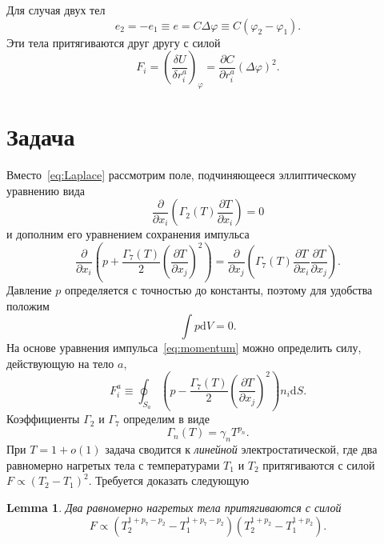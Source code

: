 \documentclass{article}
\theoremstyle{plain}
\newtheorem{lemma}{Lemma}
\newcommand{\dd}{\mathrm{d}}
\newcommand{\pder}[2][]{\frac{\partial#1}{\partial#2}}
\newcommand{\eqdef}{\equiv}
\begin{document}
Для случая двух тел
\begin{equation}\label{eq:capacity}
    e_2 = -e_1 \eqdef e = C\Delta\varphi \eqdef C(\varphi_2 - \varphi_1).
\end{equation}
Эти тела притягиваются друг другу с силой
\begin{equation}\label{eq:force2}
    F_i = \left(\frac{\delta U}{\delta r^a_i}\right)_\varphi = \pder[C]{r^a_i}(\Delta\varphi)^2.
\end{equation}

\section{Задача}

Вместо~\eqref{eq:Laplace} рассмотрим поле, подчиняющееся эллиптическому уравнению вида
\begin{equation}\label{eq:elliptic}
    \pder{x_i}\left( \Gamma_2(T) \pder[T]{x_i} \right) = 0
\end{equation}
и дополним его уравнением сохранения импульса
\begin{equation}\label{eq:momentum}
    \pder{x_i}\left( p + \frac{\Gamma_7(T)}{2}\left(\pder[T]{x_j}\right)^2 \right) =
    \pder{x_j}\left( \Gamma_7(T)\pder[T]{x_i}\pder[T]{x_j} \right).
\end{equation}
Давление \(p\) определяется с точностью до константы, поэтому для удобства положим
\begin{equation}\label{eq:pressure}
    \int p\dd{V} = 0.
\end{equation}
На основе уравнения импульса~\eqref{eq:momentum} можно определить силу, действующую на тело \(a\),
\begin{equation}\label{eq:force_ell}
    F^a_i \eqdef \oint_{S_a} \left( p - \frac{\Gamma_7(T)}{2}\left(\pder[T]{x_j}\right)^2 \right) n_i\dd{S}.
\end{equation}
Коэффициенты \(\Gamma_2\) и \(\Gamma_7\) определим в виде
\begin{equation}\label{eq:gammas}
    \Gamma_n(T) = \gamma_n T^{p_n}.
\end{equation}
При \(T=1+o(1)\) задача сводится к \emph{линейной} электростатической,
где два равномерно нагретых тела с температурами \(T_1\) и \(T_2\) притягиваются с силой \(F \propto (T_2-T_1)^2\).
Требуется доказать следующую
\begin{lemma}\label{lem:force}
    Два равномерно нагретых тела притягиваются с силой
    \begin{equation}\label{eq:force_temp}
        F \propto \left( T_2^{1+p_7-p_2} - T_1^{1+p_7-p_2} \right)\left( T_2^{1+p_2} - T_1^{1+p_2} \right).
    \end{equation}
\end{lemma}
\end{document}
